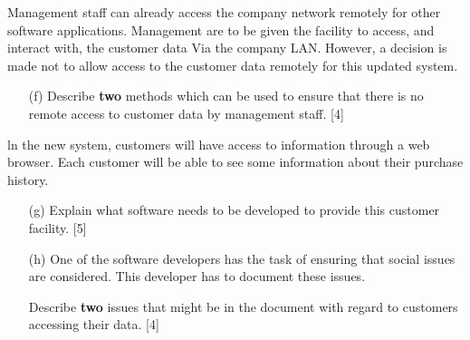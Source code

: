 Management staff can already access the company network remotely for
other software applications. Management are to be given the facility
to access, and interact with, the customer data Via the company LAN.
However, a decision is made not to allow access to the customer data
remotely for this updated system.
\begin{enumerate}
\item[(f)]  Describe \textbf{two} methods which can be used to ensure that there
is no remote access to customer data by management staff. \hfill{}{[}4{]}
\end{enumerate}
ln the new system, customers will have access to information through
a web browser. Each customer will be able to see some information
about their purchase history.
\begin{enumerate}
\item[(g)]  Explain what software needs to be developed to provide this customer
facility. \hfill{}{[}5{]}
\item[(h)]  One of the software developers has the task of ensuring that social
issues are considered. This developer has to document these issues. 

Describe \textbf{two} issues that might be in the document with regard
to customers accessing their data. \hfill{}{[}4{]}
\end{enumerate}